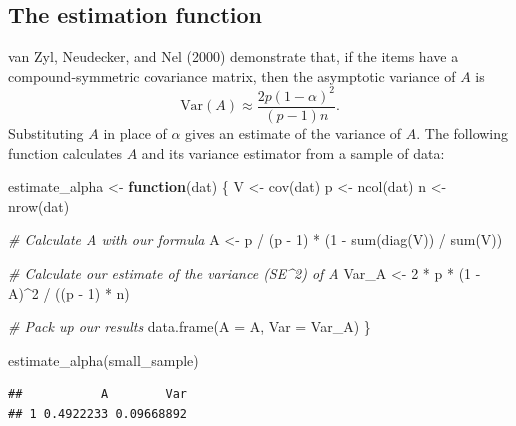 \documentclass[
]{book}
\newenvironment{Shaded}{\begin{snugshade}}{\end{snugshade}}
\newcommand{\AttributeTok}[1]{\textcolor[rgb]{0.77,0.63,0.00}{#1}}
\newcommand{\CommentTok}[1]{\textcolor[rgb]{0.56,0.35,0.01}{\textit{#1}}}
\newcommand{\ControlFlowTok}[1]{\textcolor[rgb]{0.13,0.29,0.53}{\textbf{#1}}}
\newcommand{\DecValTok}[1]{\textcolor[rgb]{0.00,0.00,0.81}{#1}}
\newcommand{\FunctionTok}[1]{\textcolor[rgb]{0.00,0.00,0.00}{#1}}
\newcommand{\NormalTok}[1]{#1}
\newcommand{\OtherTok}[1]{\textcolor[rgb]{0.56,0.35,0.01}{#1}}
\newcommand{\SpecialCharTok}[1]{\textcolor[rgb]{0.00,0.00,0.00}{#1}}
\begin{document}
\hypertarget{the-estimation-function}{%
\subsection{The estimation function}\label{the-estimation-function}}

van Zyl, Neudecker, and Nel (2000) demonstrate that, if the items have a compound-symmetric covariance matrix, then the asymptotic variance of \(A\) is
\[
\text{Var}(A) \approx \frac{2p(1 - \alpha)^2}{(p - 1) n}.
\]
Substituting \(A\) in place of \(\alpha\) gives an estimate of the variance of \(A\). The following function calculates \(A\) and its variance estimator from a sample of data:

\begin{Shaded}
\begin{Highlighting}[]
\NormalTok{estimate\_alpha }\OtherTok{\textless{}{-}} \ControlFlowTok{function}\NormalTok{(dat) \{}
\NormalTok{  V }\OtherTok{\textless{}{-}} \FunctionTok{cov}\NormalTok{(dat)}
\NormalTok{  p }\OtherTok{\textless{}{-}} \FunctionTok{ncol}\NormalTok{(dat)}
\NormalTok{  n }\OtherTok{\textless{}{-}} \FunctionTok{nrow}\NormalTok{(dat)}
  
  \CommentTok{\# Calculate A with our formula}
\NormalTok{  A }\OtherTok{\textless{}{-}}\NormalTok{ p }\SpecialCharTok{/}\NormalTok{ (p }\SpecialCharTok{{-}} \DecValTok{1}\NormalTok{) }\SpecialCharTok{*}\NormalTok{ (}\DecValTok{1} \SpecialCharTok{{-}} \FunctionTok{sum}\NormalTok{(}\FunctionTok{diag}\NormalTok{(V)) }\SpecialCharTok{/} \FunctionTok{sum}\NormalTok{(V))}
  
  \CommentTok{\# Calculate our estimate of the variance (SE\^{}2) of A}
\NormalTok{  Var\_A }\OtherTok{\textless{}{-}} \DecValTok{2} \SpecialCharTok{*}\NormalTok{ p }\SpecialCharTok{*}\NormalTok{ (}\DecValTok{1} \SpecialCharTok{{-}}\NormalTok{ A)}\SpecialCharTok{\^{}}\DecValTok{2} \SpecialCharTok{/}\NormalTok{ ((p }\SpecialCharTok{{-}} \DecValTok{1}\NormalTok{) }\SpecialCharTok{*}\NormalTok{ n)}
  
  \CommentTok{\# Pack up our results}
  \FunctionTok{data.frame}\NormalTok{(}\AttributeTok{A =}\NormalTok{ A, }\AttributeTok{Var =}\NormalTok{ Var\_A)}
\NormalTok{\}}

\FunctionTok{estimate\_alpha}\NormalTok{(small\_sample)}
\end{Highlighting}
\end{Shaded}

\begin{verbatim}
##           A        Var
## 1 0.4922233 0.09668892
\end{verbatim}
\end{document}
